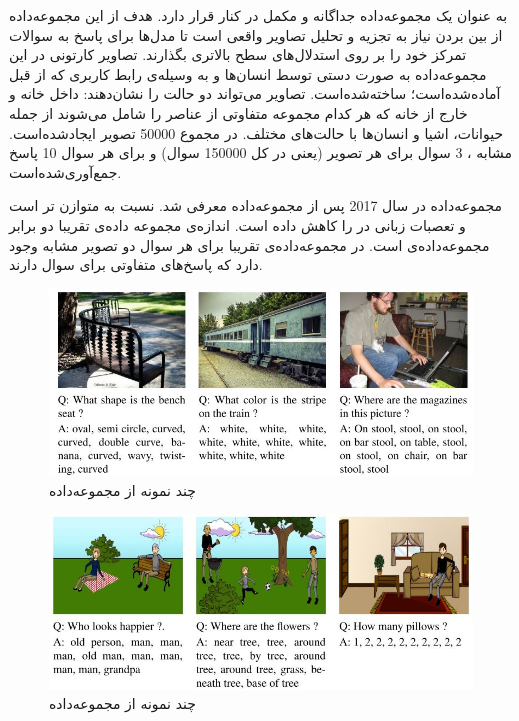   
 به عنوان یک مجموعه‌داده جداگانه و مکمل در کنار
 قرار دارد. هدف از این مجموعه‌داده از بین بردن نیاز به تجزیه و تحلیل تصاویر واقعی است تا مدل‌ها برای پاسخ به سوالات تمرکز خود را بر روی استدلال‌های سطح بالاتری بگذارند. تصاویر کارتونی در این مجموعه‌داده به صورت دستی توسط انسان‌ها و به وسیله‌ی رابط کاربری که از قبل آماده‌شده‌است؛ ساخته‌شده‌است. تصاویر می‌تواند دو حالت را نشان‌دهند: داخل خانه و خارج از خانه که هر کدام مجموعه متفاوتی از عناصر را شامل می‌شوند از جمله حیوانات، اشیا و انسان‌ها با حالت‌های مختلف. در مجموع 50000 تصویر ایجاد‌شده‌است. مشابه 
 ، 3 سوال برای هر تصویر (یعنی در کل 150000 سوال) و برای هر سوال 10 پاسخ  جمع‌آوری‌شده‌است.
 
 مجموعه‌داده 
در سال 2017 پس از مجموعه‌داده 
معرفی شد. 
نسبت به 
متوازن تر است و تعصبات زبانی در 
را کاهش داده است. اندازه‌ی مجموعه داده‌ی
تقریبا دو برابر مجموعه‌داده‌ی 
است. در مجموعه‌داده‌ی
تقریبا برای هر سوال دو تصویر مشابه وجود دارد که پاسخ‌های متفاوتی برای سوال دارند.

  \begin{figure}[h]
	\centerline{\includegraphics[scale=0.5]{images/VQA1-real.JPG}}
	\caption[چند نمونه از مجموعه‌داده  ]{چند نمونه از مجموعه‌داده  \cite{antol2015vqa}}
	\label{fig:vqa1realExample}
  \end{figure}

  \begin{figure}[h]
	\centerline{\includegraphics[scale=0.5]{images/VQA1-abstract.JPG}}
	\caption[چند نمونه از مجموعه‌داده ]{چند نمونه از مجموعه‌داده  \cite{antol2015vqa}}
	\label{fig:vqa1abstractExample}
  \end{figure}

